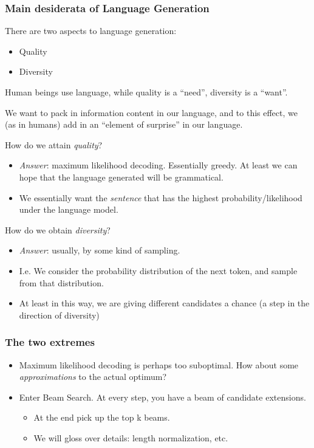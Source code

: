 \documentclass[11pt]{beamer}
\begin{document}
\begin{frame}
  \frametitle{Main desiderata of Language Generation}
There are two aspects to language generation:
\begin{itemize}
  \item Quality
  \item Diversity
\end{itemize}
Human beings use language, while quality is a ``need'', diversity is a ``want''.

We want to pack in information content in our language, and to this effect, we
(as in humans) add in an ``element of surprise'' in our language.
\end{frame}

\begin{frame}
  How do we attain {\em quality}?

\begin{itemize}
  \item
  {\em Answer}: maximum likelihood decoding. Essentially greedy.
  At least we can hope that the language generated will be
  grammatical.
\item
  We essentially want the {\em sentence} that has the highest probability/likelihood
  under the language model.
\end{itemize}
\end{frame}


\begin{frame}
  How do we obtain {\em diversity}?
\begin{itemize}
  \item
  {\em Answer}: usually, by some kind of sampling.
\item
  I.e. We consider the probability distribution of the next token, and sample from that
  distribution.
\item
  At least in this way, we are giving different candidates a chance (a step
  in the direction of diversity)
\end{itemize}
\end{frame}

\begin{frame}
  \frametitle{The two extremes}
  \begin{itemize}
    \item Maximum likelihood decoding is perhaps too suboptimal. How about some
    {\em approximations} to the actual optimum?
    \item Enter Beam Search. At every step, you have a beam of candidate extensions.
    \begin{itemize}
    \item At the
    end pick up the top k beams.
    \item We will gloss over details: length normalization, etc.
    \end{itemize}
\end{itemize}
\end{frame}
\end{document}
